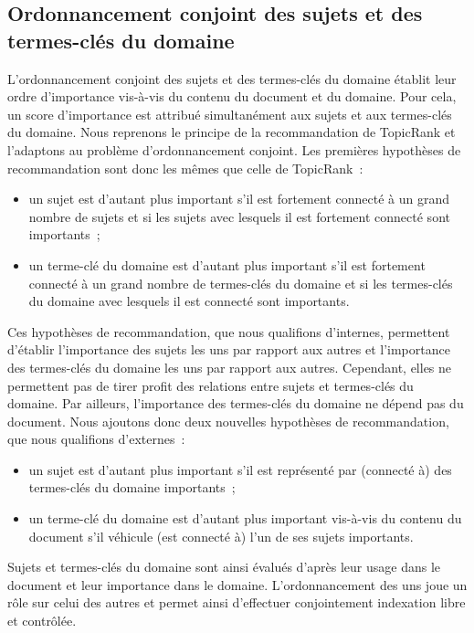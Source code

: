   \subsection{Ordonnancement conjoint des sujets et des termes-clés du domaine}
  \label{subsec:main-domain_specific_keyphrase_annotation-supervised_automatic_keyphrase_extraction-topiccorank-co_ranking}
    L'ordonnancement conjoint des sujets et des termes-clés du domaine
    établit leur ordre d'importance vis-à-vis du contenu du document et du
    domaine. Pour cela, un score d'importance est attribué simultanément aux
    sujets et aux termes-clés du domaine.
%
    Nous reprenons le principe de la recommandation de TopicRank et
    l'adaptons au problème d'ordonnancement conjoint. Les premières
    hypothèses de recommandation sont donc les mêmes que celle de
    TopicRank~:
    \begin{itemize}
      \item{un sujet est d'autant plus important s'il est fortement connecté
            à un grand nombre de sujets et si les sujets avec lesquels il
            est fortement connecté sont importants~;}
      \item{un terme-clé du domaine est d'autant plus important s'il est
            fortement connecté à un grand nombre de termes-clés du domaine
            et si les termes-clés du domaine avec lesquels il est connecté
            sont importants.}
    \end{itemize}
    Ces hypothèses de recommandation, que nous qualifions d'internes,
    permettent d'établir l'importance des sujets les uns par rapport aux
    autres et l'importance des termes-clés du domaine les uns par rapport
    aux autres. Cependant, elles ne permettent pas de tirer profit des
    relations entre sujets et termes-clés du domaine. Par ailleurs,
    l'importance des termes-clés du domaine ne  dépend pas du document. Nous
    ajoutons donc deux nouvelles hypothèses de recommandation, que nous
    qualifions d'externes~:
    \begin{itemize}
      \item{un sujet est d'autant plus important s'il est représenté par
            (connecté à) des termes-clés du domaine importants~;}
      \item{un terme-clé du domaine est d'autant plus important vis-à-vis
            du contenu du document s'il véhicule (est connecté à) l'un de
            ses sujets importants.}
    \end{itemize}
    Sujets et termes-clés du domaine sont ainsi évalués d'après leur usage
    dans le document et leur importance dans le domaine. L'ordonnancement
    des uns joue un rôle sur celui des autres et permet ainsi d'effectuer
    conjointement indexation libre et contrôlée.

